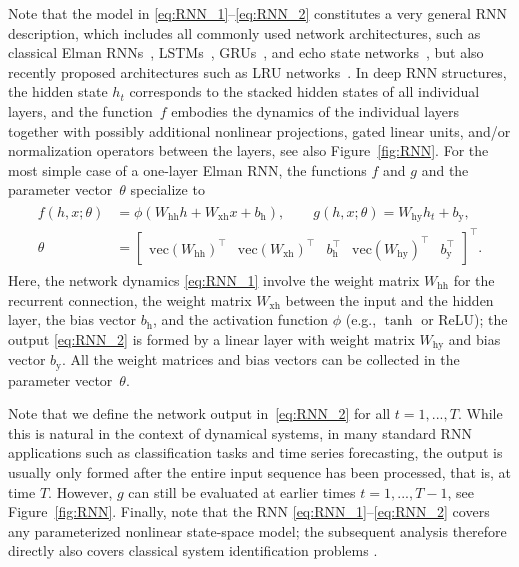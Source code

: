 \documentclass{article} %
\renewcommand{\vec}{\mathrm{vec}}
\begin{document}
Note that the model in \eqref{eq:RNN_1}--\eqref{eq:RNN_2} constitutes a very general RNN description, which includes all commonly used network architectures, such as classical Elman RNNs~\citep{Elman1990}, LSTMs~\citep{Hochreiter1997}, GRUs~\citep{Cho2014}, and echo state networks~\citep{Jaeger2002}, but also recently proposed architectures such as LRU networks~\citep{Orvieto2023}.
In deep RNN structures, the hidden state $h_t$ corresponds to the stacked hidden states of all individual layers, and the function~$f$ embodies the dynamics of the individual layers together with possibly additional nonlinear projections, gated linear units, and/or normalization operators between the layers, see also Figure~\ref{fig:RNN}.
For the most simple case of a one-layer Elman RNN, the functions $f$ and $g$ and the parameter vector~$\theta$ specialize to
\begin{align}\label{eq:elman}
	\begin{split}
		f(h,x;\theta) &= \phi(W_{\mathrm{\mathrm{hh}}}h+W_{\mathrm{\mathrm{xh}}}x + b_\mathrm{h}), \qquad g(h,x;\theta) = W_{\mathrm{\mathrm{hy}}}h_t + b_\mathrm{y},\\[-0.7ex]
		\theta &=
		\begin{bmatrix}
			\vec(W_{\mathrm{\mathrm{hh}}})^\top & \vec(W_{\mathrm{\mathrm{xh}}})^\top & b_\mathrm{h}^\top & \vec(W_{\mathrm{\mathrm{hy}}})^\top &  b_\mathrm{y}^\top
		\end{bmatrix}^\top.
	\end{split}
\end{align}
Here, the network dynamics \eqref{eq:RNN_1} involve the weight matrix $W_{\mathrm{hh}}$ for the recurrent connection, the weight matrix $W_{\mathrm{xh}}$ between the input and the hidden layer, the bias vector $b_\mathrm{h}$, and the activation function $\phi$ (e.g., $\tanh$ or ReLU); the output \eqref{eq:RNN_2} is formed by a linear layer with weight matrix $W_{\mathrm{hy}}$ and bias vector $b_\mathrm{y}$. All the weight matrices and bias vectors can be collected in the parameter vector~$\theta$.


Note that we define the network output in~\eqref{eq:RNN_2} for all $t=1,...,T$. While this is natural in the context of dynamical systems, in many standard RNN applications such as classification tasks and time series forecasting, the output is usually only formed after the entire input sequence has been processed, that is, at time $T$. However, $g$ can still be evaluated at earlier times $t=1,...,T-1$, see Figure~\ref{fig:RNN}. Finally, note that the RNN \eqref{eq:RNN_1}--\eqref{eq:RNN_2} covers any parameterized nonlinear state-space model; the subsequent analysis therefore directly also covers classical system identification problems \citep{Ljung1999}.
\end{document}
